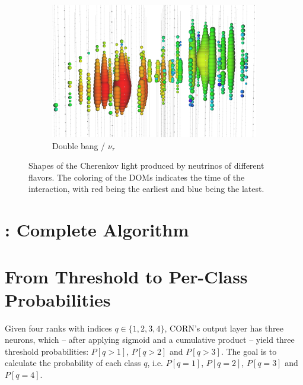 \begin{figure}
\begin{subfigure}{0.3\textwidth}
    \centering
    \includegraphics[width=\textwidth]{content/img/signatures/double_bang.png}
    \caption{
        Double bang / $\nu_\tau$
    }
  \end{subfigure}
  \caption{
    Shapes of the Cherenkov light produced by neutrinos of different flavors.
    The coloring of the \acp{DOM} indicates the time of the interaction,
    with red being the earliest and blue being the latest.
    \cite{kowalski2017} %
  }
  \label{fig:img:icecube:interactions}
\end{figure}


\clearpage
\section{\dseaplustitle{}: Complete Algorithm} \label{sec:alg:dseaplus}



\clearpage
\section{From Threshold to Per-Class Probabilities}
\label{sec:appendix:corn_probas}
Given four ranks with indices $q \in \{1, 2, 3, 4\}$,
\Ac{CORN}'s output layer has three neurons, which
  – after applying sigmoid and a cumulative product –
yield three threshold probabilities:
	$P[q>1]$,
	$P[q>2]$ and
	$P[q>3]$.
The goal is to calculate the probability of each class $q$,
i.e. $P[q=1]$, $P[q=2]$, $P[q=3]$ and $P[q=4]$.

